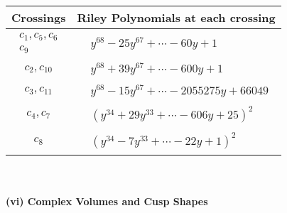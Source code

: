 \documentclass[1p]{elsarticle_modified}
\theoremstyle{definition}
\begin{document}
\begin{tabular}{m{50pt}|m{274pt}}
Crossings & \hspace{64pt}Riley Polynomials at each crossing \\
\hline $$\begin{aligned}c_{1},c_{5},c_{6}\\c_{9}\end{aligned}$$&$\begin{aligned}
&y^{68}-25 y^{67}+\cdots-60 y+1
\end{aligned}$\\
\hline $$\begin{aligned}c_{2},c_{10}\end{aligned}$$&$\begin{aligned}
&y^{68}+39 y^{67}+\cdots-600 y+1
\end{aligned}$\\
\hline $$\begin{aligned}c_{3},c_{11}\end{aligned}$$&$\begin{aligned}
&y^{68}-15 y^{67}+\cdots-2055275 y+66049
\end{aligned}$\\
\hline $$\begin{aligned}c_{4},c_{7}\end{aligned}$$&$\begin{aligned}
&(y^{34}+29 y^{33}+\cdots-606 y+25)^{2}
\end{aligned}$\\
\hline $$\begin{aligned}c_{8}\end{aligned}$$&$\begin{aligned}
&(y^{34}-7 y^{33}+\cdots-22 y+1)^{2}
\end{aligned}$\\
\hline
\end{tabular}\\~\\
\newpage\flushleft \textbf{(vi) Complex Volumes and Cusp Shapes}
\end{document}
